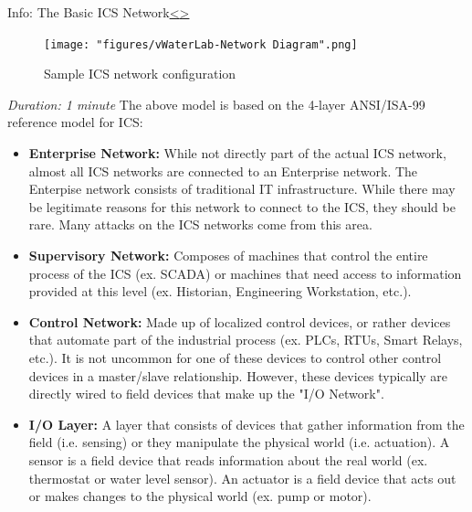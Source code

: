 \documentclass[12pt]{extarticle}
\newcommand{\bi}{\begin{itemize}}
\newcommand{\ei}{\end{itemize}}
\newcounter{next}
\newcounter{prev}
\begin{document}

\pagebreak
{}
\begin{slide}{Info: The Basic ICS Network}{\hyperref[slide \theprev]{\textless}\hyperref[slide \thenext]{\textgreater}}
	\vspace{-.75cm}
	\begin{figure}[H]
		\centering
		\texttt{[image: "figures/vWaterLab-Network Diagram".png]}
		\caption{Sample ICS network configuration}
	\end{figure}
\end{slide}
\textit{Duration: 1 minute}
\vfill
\noindent
The above model is based on the 4-layer  ANSI/ISA-99 reference model for ICS:
\bi
	\item \textbf{Enterprise Network:} While not directly part of the actual ICS network, almost all ICS networks are connected to an Enterprise network. The Enterpise network consists of traditional IT infrastructure. While there may be legitimate reasons for this network to connect to the ICS, they should be rare. Many attacks on the ICS networks come from this area.
	\item \textbf{Supervisory Network:} Composes of machines that control the entire process of the ICS (ex. SCADA) or machines that need access to information provided at this level (ex. Historian, Engineering Workstation, etc.).
	\item \textbf{Control Network:} Made up of localized control devices, or rather devices that automate part of the industrial process (ex. PLCs, RTUs, Smart Relays, etc.). It is not uncommon for one of these devices to control other control devices in a master/slave relationship. However, these devices typically are directly wired to field devices that make up the "I/O Network".
	\item \textbf{I/O Layer:} A layer that consists of devices that gather information from the field (i.e. sensing) or they manipulate the physical world (i.e. actuation). A sensor is a field device that reads information about the real world (ex. thermostat or water level sensor). An actuator is a field device that acts out or makes changes to the physical world (ex. pump or motor).
\ei
\pagebreak

\end{document}
